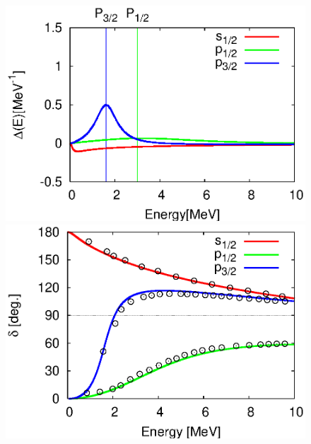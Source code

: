 \documentclass[english,a4paper]{jsarticle}
\begin{document}
\begin{figure}
  \begin{minipage}{0.5\textwidth}
    \begin{flushright}
      \includegraphics[width=1.0\textwidth,clip]{../cld/cld_sp.eps}
    \end{flushright}
  \end{minipage}
  \begin{minipage}{0.5\textwidth}
    \begin{flushright}
      \includegraphics[width=1.0\textwidth,clip]{../phs/phs_sp.eps}
    \end{flushright}
  \end{minipage}
\end{figure}
\end{document}
